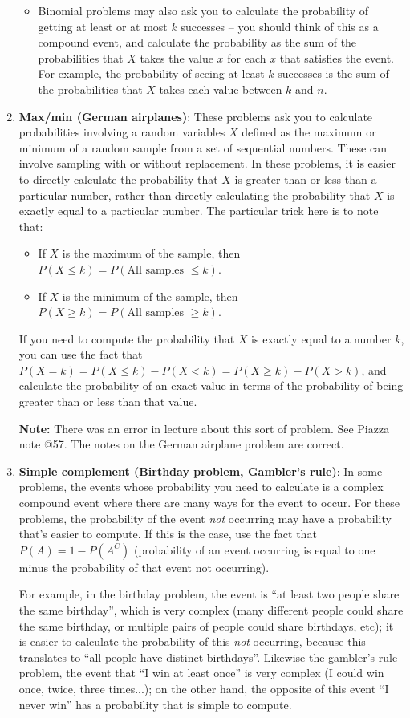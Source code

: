 \documentclass[11pt]{article}
\begin{document}
\begin{enumerate}
\begin{itemize}
    \item Binomial problems may also ask you to calculate the probability of getting at least or at most $k$ successes -- you should think of this as a compound event, and calculate the probability as the sum of the probabilities that $X$ takes the value $x$ for each $x$ that satisfies the event. For example, the probability of seeing at least $k$ successes is the sum of the probabilities that $X$ takes each value between $k$ and $n$.
    \end{itemize}
\item {\bf Max/min (German airplanes)}: These problems ask you to calculate probabilities involving a random variables $X$ defined as the maximum or minimum of a random sample from a set of sequential numbers. These can involve sampling with or without replacement. In these problems, it is easier to directly calculate the probability that $X$ is greater than or less than a particular number, rather than directly calculating the probability that $X$ is exactly equal to a particular number. The particular trick here is to note that:
\begin{itemize}
\item If $X$ is the maximum of the sample, then $P(X \leq k) = P(\textrm{All samples } \leq k)$.
\item If $X$ is the minimum of the sample, then $P(X \geq k) = P(\textrm{All samples } \geq k)$.
\end{itemize}
If you need to compute the probability that $X$ is exactly equal to a number $k$, you can use the fact that $P(X = k) = P(X \leq k) - P(X < k) = P(X \geq k) - P(X > k)$, and calculate the probability of an exact value in terms of the probability of being greater than or less than that value.

{\bf Note:} There was an error in lecture about this sort of problem. See Piazza note @57. The notes on the German airplane problem are correct.
\item {\bf Simple complement (Birthday problem, Gambler's rule)}: In some problems, the events whose probability you need to calculate is a complex compound event where there are many ways for the event to occur. For these problems, the probability of the event \emph{not} occurring may have a probability that's easier to compute. If this is the case, use the fact that $P(A) = 1-P(A^C)$ (probability of an event occurring is equal to one minus the probability of that event not occurring).

For example, in the birthday problem, the event is ``at least two people share the same birthday'', which is very complex (many different people could share the same birthday, or multiple pairs of people could share birthdays, etc); it is easier to calculate the probability of this \emph{not} occurring, because this translates to ``all people have distinct birthdays''. Likewise the gambler's rule problem, the event that ``I win at least once'' is very complex (I could win once, twice, three times...); on the other hand, the opposite of this event ``I never win'' has a probability that is simple to compute.


\end{enumerate}
\end{document}
